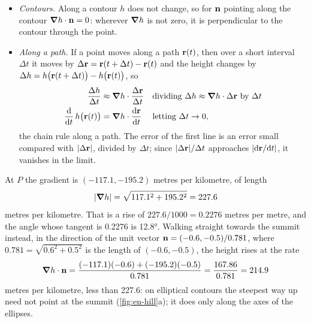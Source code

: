 \begin{toolbox}
\begin{itemize}
   direction of a unit vector $\vb{n}$, a vector of length 1, $\Delta\vb{r}
   = \ell\vb{n}$ and $\Delta h \approx \ell\,\grad h\cdot\vb{n}$. Dividing
   by $\ell$, the height changes at the rate $\grad h\cdot\vb{n} =
   \lvert\grad h\rvert\,\lvert\vb{n}\rvert\cos\theta = \lvert\grad
   h\rvert\cos\theta$ per unit distance, with $\theta$ the angle between
   $\vb{n}$ and $\grad h$. The rate is greatest for $\theta = 0$, where
   $\cos\theta = 1$: the gradient points up the steepest slope, and its
   length is that slope.
\item \emph{Contours.} Along a contour $h$ does not change, so for
   $\vb{n}$ pointing along the contour $\bm{\nabla} h\cdot\bm{\mathrm{n}} = 0$: wherever
   $\grad h$ is not zero, it is perpendicular to the contour through the
   point.
\item \emph{Along a path.} If a point moves along a path $\bm{\mathrm{r}}(t)$, then
   over a short interval $\Delta t$ it moves by $\Delta\bm{\mathrm{r}} = \bm{\mathrm{r}}(t +
   \Delta t) - \bm{\mathrm{r}}(t)$ and the height changes by $\Delta h =
   h\bigl(\bm{\mathrm{r}}(t + \Delta t)\bigr) - h\bigl(\bm{\mathrm{r}}(t)\bigr)$, so
   \begin{align*}
      \frac{\Delta h}{\Delta t}
      &\approx \bm{\nabla} h\cdot\frac{\Delta\bm{\mathrm{r}}}{\Delta t}
         && \text{dividing $\Delta h \approx \bm{\nabla} h\cdot\Delta\bm{\mathrm{r}}$
            by $\Delta t$}\\
      \frac{\mathrm{d}}{\mathrm{d} t}\,h\bigl(\bm{\mathrm{r}}(t)\bigr)
      &= \bm{\nabla} h\cdot\frac{\mathrm{d}\bm{\mathrm{r}}}{\mathrm{d} t}
         && \text{letting $\Delta t \to 0$,}
   \end{align*}
   the chain rule along a path. The error of the first line is an error
   small compared with $\lvert\Delta\bm{\mathrm{r}}\rvert$, divided by $\Delta t$;
   since $\lvert\Delta\bm{\mathrm{r}}\rvert/\Delta t$ approaches $\lvert\mathrm{d}\bm{\mathrm{r}}/
   \mathrm{d} t\rvert$, it vanishes in the limit.
\end{itemize}
At $P$ the gradient is $(-117.1, -195.2)$ metres per kilometre, of length
\begin{equation*}
   \lvert\bm{\nabla} h\rvert = \sqrt{117.1^2 + 195.2^2} = 227.6
\end{equation*}
metres per kilometre. That is a rise of $227.6/1000 = 0.2276$ metres per
metre, and the angle whose tangent is 0.2276 is \ang{12.8}. Walking
straight towards the summit instead, in the direction of the unit vector
$\bm{\mathrm{n}} = (-0.6, -0.5)/0.781$, where $0.781 = \sqrt{0.6^2 + 0.5^2}$ is the
length of $(-0.6, -0.5)$, the height rises at the rate
\begin{equation*}
   \bm{\nabla} h\cdot\bm{\mathrm{n}}
   = \frac{(-117.1)(-0.6) + (-195.2)(-0.5)}{0.781}
   = \frac{167.86}{0.781} = 214.9
\end{equation*}
metres per kilometre, less than 227.6: on elliptical contours the
steepest way up need not point at the summit (\cref{fig:en-hill}a); it
does only along the axes of the ellipses.
\end{toolbox}


